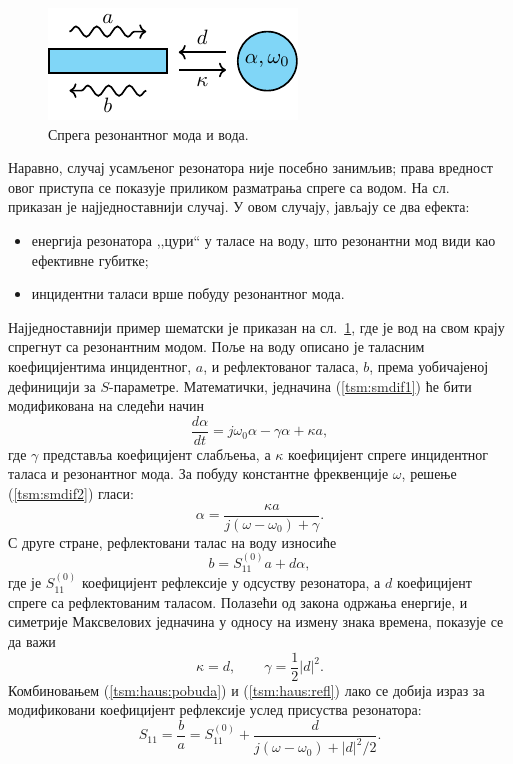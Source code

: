 \documentclass[main.tex]{subfiles}
\begin{document}
\begin{figure}[h] 
\centering
\includegraphics[width=0.4\linewidth]{sl_tsm/sm-vod1.pdf}
\caption{Спрега резонантног мода и вода.}
\label{tsm:fig:slike/smfig}
\end{figure}
Наравно, случај усамљеног резонатора није посебно занимљив; права вредност овог приступа се показује приликом разматрања спреге са водом. На сл.~ приказан је најједноставнији случај. У овом случају, јављају се два ефекта:
\begin{itemize}
\item енергија резонатора ,,цури`` у таласе на воду, што резонантни мод види као ефективне губитке;
\item инцидентни таласи врше побуду резонантног мода.
\end{itemize}
Најједноставнији пример шематски је приказан на сл.~\ref{tsm:fig:slike/smfig}, где је вод на свом крају спрегнут са резонантним модом. Поље на воду описано је таласним коефицијентима инцидентног, $a$, и рефлектованог таласа, $b$, према уобичајеној дефиницији за $S$-параметре. Математички, једначина (\ref{tsm:smdif1}) ће бити модификована на следећи начин
\begin{equation}
\frac{d\alpha}{dt} = j\omega_0 \alpha - \gamma \alpha + \kappa a,
\label{tsm:smdif2}
\end{equation}
где $\gamma$ представља коефицијент слабљења, а $\kappa$ коефицијент спреге инцидентног таласа и резонантног мода. За побуду константне фреквенције $\omega$, решење (\ref{tsm:smdif2}) гласи:
\begin{equation}
\alpha = \frac{\kappa a}{j(\omega-\omega_0) + \gamma}.
\label{tsm:haus:pobuda}
\end{equation}
С друге стране, рефлектовани талас на воду износиће
\begin{equation}
b = S_{11}^{(0)} a + d\alpha,
\label{tsm:haus:refl}
\end{equation}
где је $S_{11}^{(0)}$ коефицијент рефлексије у одсуству резонатора, а $d$ коефицијент спреге са рефлектованим таласом. Полазећи од закона одржања енергије, и симетрије Максвелових једначина у односу на измену знака времена, показује се да важи
\begin{equation}
\kappa = d,\qquad \gamma = \frac{1}{2}|d|^2.
\end{equation}
Комбиновањем (\ref{tsm:haus:pobuda}) и (\ref{tsm:haus:refl}) лако се добија израз за модификовани коефицијент рефлексије услед присуства резонатора:
\begin{equation}
S_{11} = \frac{b}{a} = S_{11}^{(0)} + \frac{d}{j(\omega-\omega_0) + {|d|^2}/{2}}.
\end{equation}
\end{document}
